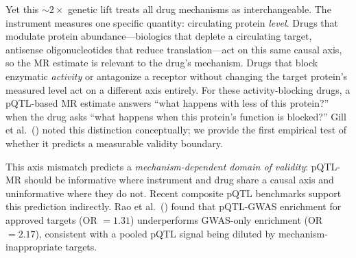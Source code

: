 \documentclass[11pt]{article}
\begin{document}
Yet this ${\sim}2\times$ genetic lift treats all drug mechanisms as interchangeable. The instrument measures one specific quantity: circulating protein \emph{level}. Drugs that modulate protein abundance---biologics that deplete a circulating target, antisense oligonucleotides that reduce translation---act on this same causal axis, so the MR estimate is relevant to the drug's mechanism. Drugs that block enzymatic \emph{activity} or antagonize a receptor without changing the target protein's measured level act on a different axis entirely. For these activity-blocking drugs, a pQTL-based MR estimate answers ``what happens with less of this protein?'' when the drug asks ``what happens when this protein's function is blocked?'' Gill et al.\ (\citeyear{gill2021mendelian}) noted this distinction conceptually; we provide the first empirical test of whether it predicts a measurable validity boundary.

This axis mismatch predicts a \emph{mechanism-dependent domain of validity}: pQTL-MR should be informative where instrument and drug share a causal axis and uninformative where they do not. Recent composite pQTL benchmarks support this prediction indirectly. Rao et al.\ (\citeyear{rao2023pqtl}) found that pQTL-GWAS enrichment for approved targets (OR $= 1.31$) underperforms GWAS-only enrichment (OR $= 2.17$), consistent with a pooled pQTL signal being diluted by mechanism-inappropriate targets.
\end{document}
